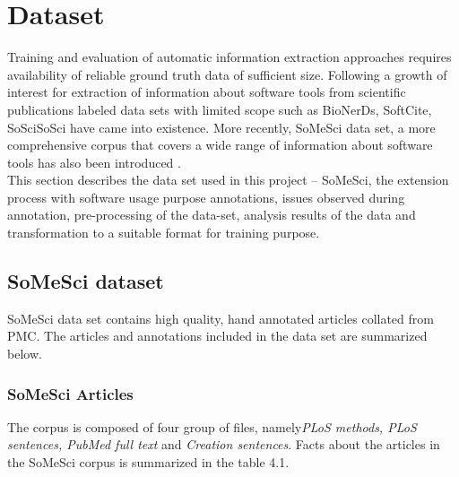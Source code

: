 \chapter{Dataset}
\label{ch:dataset}
 
%
%

Training and evaluation of automatic information extraction approaches requires availability of reliable ground truth data of sufficient size. Following a growth of interest for extraction of information about software tools from scientific publications labeled data sets with limited scope such as BioNerDs, SoftCite, SoSciSoSci have came into existence. More recently, \ac{SoMeSci} data set, a more comprehensive corpus that covers a wide range of information about software tools has also been introduced \citep{schindler2021somesci}.  \\

This section describes the data set used in this project – \ac{SoMeSci},  the extension process with software usage purpose annotations, issues observed during annotation, pre-processing of the data-set, analysis results of the data and transformation to a suitable format for training purpose.  


\section{SoMeSci dataset}
\label{sec:dataset:SoMeSci}

\ac{SoMeSci} data set contains high quality, hand annotated articles collated from  \ac{PMC}. The articles and annotations included in the data set are summarized below.  

\subsection{ SoMeSci Articles }
\label{subsec:dataset:SoMeSci:Articles}

The corpus is composed of four group of files, namely\emph{PLoS methods, PLoS sentences, PubMed full text} and \emph{Creation sentences}. Facts about the articles in the \ac{SoMeSci} corpus is summarized in the table 4.1. \\

